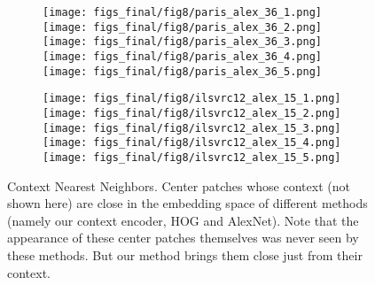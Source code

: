 \documentclass[10pt,twocolumn,letterpaper]{article}
\newcommand{\lblfig}[1]{\label{fig:#1}}
\begin{document}
\begin{figure*}[t]
\begin{subfigure}[b]{0.5\linewidth}
\end{subfigure}
\begin{subfigure}[b]{0.5\linewidth}
\centering
{}\;
\texttt{[image: figs\_final/fig8/paris\_alex\_36\_1.png]}
\texttt{[image: figs\_final/fig8/paris\_alex\_36\_2.png]}
\texttt{[image: figs\_final/fig8/paris\_alex\_36\_3.png]}
\texttt{[image: figs\_final/fig8/paris\_alex\_36\_4.png]}
\texttt{[image: figs\_final/fig8/paris\_alex\_36\_5.png]}
\end{subfigure}
\begin{subfigure}[b]{0.5\linewidth}
\centering
{}\;
\texttt{[image: figs\_final/fig8/ilsvrc12\_alex\_15\_1.png]}
\texttt{[image: figs\_final/fig8/ilsvrc12\_alex\_15\_2.png]}
\texttt{[image: figs\_final/fig8/ilsvrc12\_alex\_15\_3.png]}
\texttt{[image: figs\_final/fig8/ilsvrc12\_alex\_15\_4.png]}
\texttt{[image: figs\_final/fig8/ilsvrc12\_alex\_15\_5.png]}
\end{subfigure}
\vspace{-1em}
\caption{Context Nearest Neighbors. Center patches whose context (not shown here) are close in the embedding space of different methods (namely our context encoder, HOG and AlexNet).
Note that the appearance of these center patches themselves was never seen by these methods.
But our method brings them close just from their context.
}
\lblfig{nnpatches}
\end{figure*}
\end{document}
